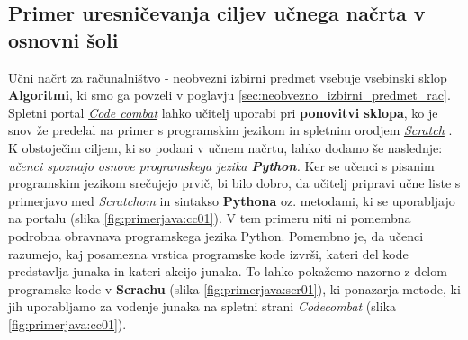 \subsection{Primer uresničevanja ciljev učnega načrta v osnovni šoli}
\label{sec:uresn-cilj-unega-os}

Učni načrt za računalništvo - neobvezni izbirni predmet
\cite{ucni_nacrt-neobvezni-izbirni-os} vsebuje vsebinski sklop
\textbf{Algoritmi}, ki smo ga povzeli v poglavju
\ref{sec:neobvezno_izbirni_predmet_rac}. Spletni portal
\emph{\href{https://codecombat.com/}{Code combat}}
\cite{web:codecombat} lahko učitelj uporabi pri\textbf{ ponovitvi
  sklopa}, ko je snov že predelal na primer s programskim jezikom in
spletnim orodjem \emph{\href{https://scratch.mit.edu/}{Scratch}}
\cite{web:scratch}. K obstoječim ciljem, ki so podani v učnem načrtu,
lahko dodamo še naslednje: \emph{učenci spoznajo osnove programskega
  jezika \textbf{Python}.}  Ker se učenci s pisanim programskim
jezikom srečujejo prvič, bi bilo dobro, da učitelj pripravi učne liste
s primerjavo med \emph{Scratchom} in sintakso \textbf{Pythona}
oz. metodami, ki se uporabljajo na portalu (slika
\ref{fig:primerjava:cc01}). V tem primeru niti ni pomembna podrobna
obravnava programskega jezika Python. Pomembno je, da učenci razumejo,
kaj posamezna vrstica programske kode izvrši, kateri del kode
predstavlja junaka in kateri akcijo junaka. To lahko pokažemo nazorno
z delom programske kode v \textbf{Scrachu} (slika
\ref{fig:primerjava:scr01}), ki ponazarja metode, ki jih uporabljamo
za vodenje junaka na spletni strani \emph{Codecombat} (slika
\ref{fig:primerjava:cc01}).

